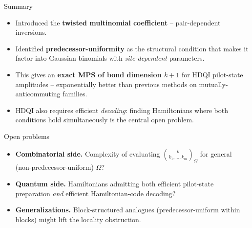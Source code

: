\documentclass{beamer}
\renewcommand{\>}{\rangle}
\newcommand{\<}{\langle}
\begin{document}

\begin{frame}{Summary}

\begin{itemize}
    \item Introduced the \textbf{twisted multinomial coefficient}
    -- pair-dependent inversions.

    \bigskip
    \item Identified \textbf{predecessor-uniformity} as the structural
    condition that makes it factor into Gaussian binomials with
    \emph{site-dependent} parameters.

    \bigskip
    \item This gives an \textbf{exact MPS of bond dimension $k+1$} for
    HDQI pilot-state amplitudes -- exponentially better than previous
    methods on mutually-anticommuting families.

    \bigskip
    \item HDQI also requires efficient \emph{decoding}: finding
    Hamiltonians where both conditions hold simultaneously is the
    central open problem.
\end{itemize}
\end{frame}


\begin{frame}{Open problems}

\begin{itemize}
    \item \textbf{Combinatorial side.} Complexity of evaluating
    $\binom{k}{k_1,\ldots,k_m}_\Omega$ for general (non-predecessor-uniform) $\Omega$?

    \bigskip
    \item \textbf{Quantum side.} Hamiltonians admitting both efficient
    pilot-state preparation \emph{and} efficient Hamiltonian-code decoding?

    \bigskip
    \item \textbf{Generalizations.} Block-structured analogues
    (predecessor-uniform within blocks) might lift the locality obstruction.
\end{itemize}
\end{frame}

\end{document}
